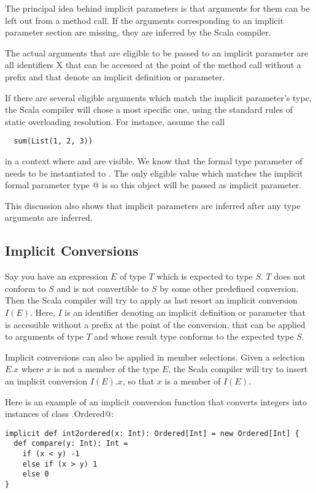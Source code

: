 {The principal idea behind implicit parameters is that arguments for
them can be left out from a method call. If the arguments
corresponding to an implicit parameter section are missing, they are
inferred by the Scala compiler.

The actual arguments that are eligible to be passed to an implicit
parameter are all identifiers X that can be accessed at the point
of the method call without a prefix and that denote an implicit
definition or parameter.

If there are several eligible arguments which match the implicit
parameter's type, the Scala compiler will chose a most specific one,
using the standard rules of static overloading resolution.
For instance, assume the call
\begin{lstlisting}
  sum(List(1, 2, 3))
\end{lstlisting}
in a context where \lstinline@stringMonoid@ and \lstinline@intMonoid@
are visible.  We know that the formal type parameter \lstinline@a@ of
\lstinline@sum@ needs to be instantiated to \lstinline@int@. The only
eligible value which matches the implicit formal parameter type
\lstinline@Monoid[Int]@ is \lstinline@intMonoid@ so this object will %
be passed as implicit parameter.

This discussion also shows that implicit parameters are inferred after
any type arguments are inferred. 

\subsection*{Implicit Conversions}

Say you have an expression $E$ of type $T$ which is expected to type
$S$. $T$ does not conform to $S$ and is not convertible to $S$ by
some other predefined conversion. Then the Scala compiler will try to
apply as last resort an implicit conversion $I(E)$. Here, $I$ is an
identifier denoting an implicit definition or parameter that is
accessible without a prefix at the point of the conversion, that can
be applied to arguments of type $T$ and whose result type conforms to the
expected type $S$.

Implicit conversions can also be applied in member
selections. Given a selection $E.x$ where $x$ is not a member of the
type $E$, the Scala compiler will try to insert an implicit conversion
$I(E).x$, so that $x$ is a member of $I(E)$.

Here is an example of an implicit conversion function that converts
integers into instances of class \lstinline@scala.Ordered@:
\begin{lstlisting}
implicit def int2ordered(x: Int): Ordered[Int] = new Ordered[Int] {
  def compare(y: Int): Int =
    if (x < y) -1
    else if (x > y) 1
    else 0
}
\end{lstlisting}

}
